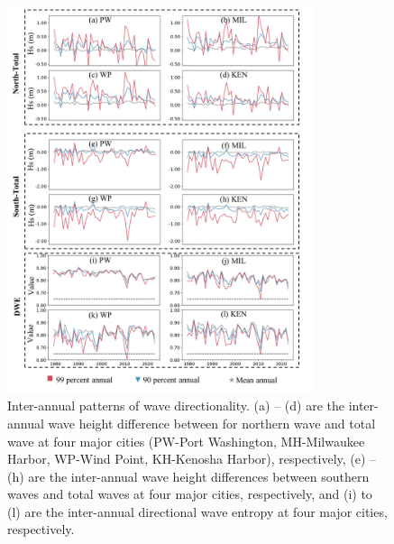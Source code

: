 \begin{figure}[htbp]
  \centering
  \includegraphics[width=0.8\textwidth]{chapter3/resources/figure3-5.jpg}
  \caption{Inter-annual patterns of wave directionality. (a) – (d) are the inter-annual wave height difference between for northern wave and total wave at four major cities (PW-Port Washington, MH-Milwaukee Harbor, WP-Wind Point, KH-Kenosha Harbor), respectively, (e) – (h) are the inter-annual wave height differences between southern waves and total waves at four major cities, respectively, and (i) to (l) are the inter-annual directional wave entropy at four major cities, respectively. }
  \label{fig:fig3.5}
\end{figure}

